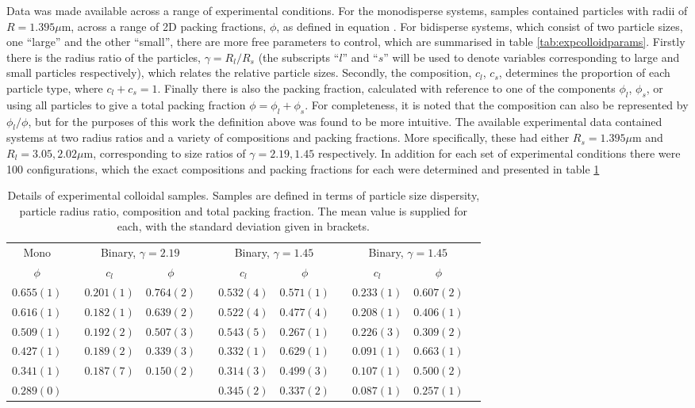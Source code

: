 Data was made available across a range of experimental conditions.
For the monodisperse systems, samples contained particles with radii of $R=1.395\mu$m, across a range of 2D packing fractions, $\phi$, as defined in equation .
For bidisperse systems, which consist of two particle sizes, one ``large'' and the other ``small'', there are more free parameters to control, which are summarised in table \ref{tab:expcolloidparams}.
Firstly there is the radius ratio of the particles, $\gamma=R_l/R_s$ (the subscripts ``$l$'' and ``$s$'' will be used to denote variables corresponding to large and small particles respectively), which relates the relative particle sizes.
Secondly, the composition, $c_l$, $c_s$, determines the proportion of each particle type, where $c_l+c_s=1$.
Finally there is also the packing fraction, calculated with reference to one of the components $\phi_l$, $\phi_s$, or using all particles to give a total packing fraction $\phi=\phi_l+\phi_s$.
For completeness, it is noted that the composition can also be represented by $\phi_l/\phi$, but for the purposes of this work the definition above was found to be more intuitive.
The available experimental data contained systems at two radius ratios and a variety of compositions and packing fractions.
More specifically, these had either $R_s=1.395\mu$m and $R_l=3.05,2.02\mu$m, corresponding to size ratios of $\gamma=2.19, 1.45$ respectively.
In addition for each set of experimental conditions there were 100 configurations, which the exact compositions and packing fractions for each were determined and presented in table \ref{tab:expcolloid}

\begin{table}
\centering
\caption{Details of experimental colloidal samples. Samples are defined in terms of particle size dispersity, particle radius ratio, composition and total packing fraction. The mean value is supplied for each, with the standard deviation given in brackets.}
\label{tab:expcolloid}
\begin{tabular}{@{}ccccccccccc@{}}
\toprule
\multicolumn{1}{c}{Mono} & \phantom{x} & \multicolumn{2}{c}{Binary, $\gamma=2.19$} & \phantom{x} & \multicolumn{2}{c}{Binary, $\gamma=1.45$} & \phantom{x} & \multicolumn{2}{c}{Binary, $\gamma=1.45$}\\ 
\cmidrule{1-1} \cmidrule{3-4} \cmidrule{6-7} \cmidrule{9-10}
$\phi$ & & $c_l$ & $\phi$ &  & $c_l$ & $\phi$ & & $c_l$ & $\phi$  \\ 
\midrule
$0.655(1)$&&$0.201(1)$&$0.764(2)$&&$0.532(4)$&$0.571(1)$&&$0.233(1)$&$0.607(2)$\\
$0.616(1)$&&$0.182(1)$&$0.639(2)$&&$0.522(4)$&$0.477(4)$&&$0.208(1)$&$0.406(1)$\\
$0.509(1)$&&$0.192(2)$&$0.507(3)$&&$0.543(5)$&$0.267(1)$&&$0.226(3)$&$0.309(2)$\\
$0.427(1)$&&$0.189(2)$&$0.339(3)$&&$0.332(1)$&$0.629(1)$&&$0.091(1)$&$0.663(1)$\\
$0.341(1)$&&$0.187(7)$&$0.150(2)$&&$0.314(3)$&$0.499(3)$&&$0.107(1)$&$0.500(2)$\\
$0.289(0)$&& &&&$0.345(2)$&$0.337(2)$&&$0.087(1)$&$0.257(1)$\\
\bottomrule
\end{tabular}
\end{table}

